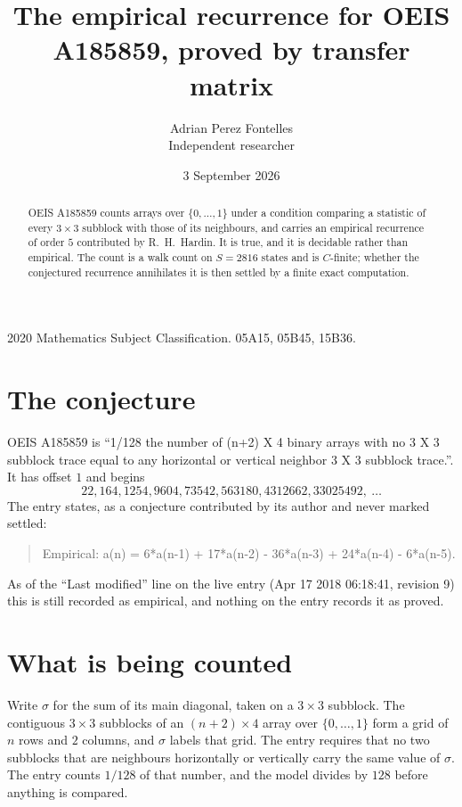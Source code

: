 \documentclass[11pt,a4paper]{article}
\title{The empirical recurrence for OEIS A185859, proved by transfer matrix}
\author{Adrian Perez Fontelles\\ \small Independent researcher}
\date{3 September 2026}
\theoremstyle{plain}
\theoremstyle{definition}
\begin{document}
\maketitle

\begin{abstract}
OEIS A185859 counts arrays over $\{0,\dots,1\}$ under a condition comparing a statistic of
every $3\times3$ subblock with those of its neighbours, and carries an empirical recurrence
of order $5$ contributed by R.~H.~Hardin. It is true, and it is decidable rather than
empirical. The count is a walk count on $S=2816$ states and is $C$-finite; whether the
conjectured recurrence annihilates it is then settled by a finite exact computation.
\end{abstract}

\noindent\small 2020 Mathematics Subject Classification. 05A15, 05B45, 15B36.\normalsize

\section{The conjecture}

OEIS A185859 is ``1/128 the number of (n+2) X 4 binary arrays with no 3 X 3 subblock trace equal to any horizontal or vertical neighbor 3 X 3 subblock trace.''. It has offset $1$ and begins
\[
22, 164, 1254, 9604, 73542, 563180, 4312662, 33025492,\ \dots
\]
The entry states, as a conjecture contributed by its author and never marked settled:
\begin{quote}
Empirical: a(n) = 6*a(n-1) + 17*a(n-2) - 36*a(n-3) + 24*a(n-4) - 6*a(n-5).
\end{quote}
As of the ``Last modified'' line on the live entry (Apr 17 2018 06:18:41, revision 9) this is still
recorded as empirical, and nothing on the entry records it as proved.

\section{What is being counted}

Write $\sigma$ for the sum of its main diagonal, taken on a $3\times3$ subblock. The contiguous $3\times3$
subblocks of an $(n+2)\times4$ array over $\{0,\dots,1\}$ form a grid of $n$ rows
and $2$ columns, and $\sigma$ labels that grid. The entry
requires that no two subblocks that are neighbours horizontally or vertically carry the same value of $\sigma$. The entry counts $1/128$ of that number, and the model divides by $128$ before anything is compared.
\end{document}
